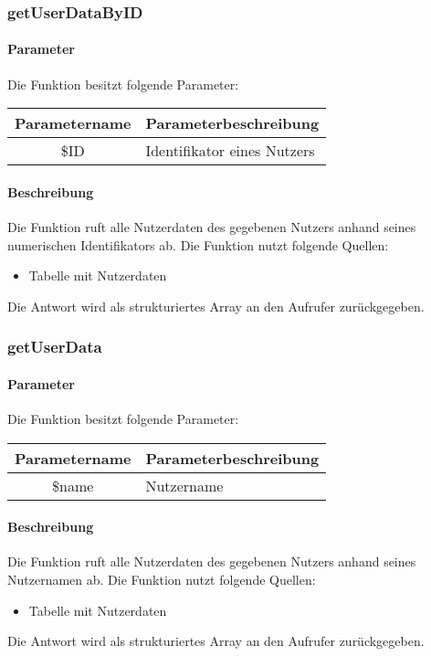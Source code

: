 \subsubsection{getUserDataByID}
\paragraph{Parameter} Die Funktion besitzt folgende Parameter:
\begin{table}[H]
	\begin{tabular}{|c|p{11cm}|}
		\hline
		\textbf{Parametername} & \textbf{Parameterbeschreibung} \\ \hline
		\$ID & Identifikator eines Nutzers \\ \hline
	\end{tabular}
\end{table}
\paragraph{Beschreibung} Die Funktion ruft alle Nutzerdaten des gegebenen Nutzers anhand seines numerischen Identifikators ab. Die Funktion nutzt folgende Quellen:
\begin{itemize}
	\item Tabelle mit Nutzerdaten
\end{itemize}
Die Antwort wird als strukturiertes Array an den Aufrufer zurückgegeben.
\subsubsection{getUserData}
\paragraph{Parameter} Die Funktion besitzt folgende Parameter:
\begin{table}[H]
	\begin{tabular}{|c|p{11cm}|}
		\hline
		\textbf{Parametername} & \textbf{Parameterbeschreibung} \\ \hline
		\$name & Nutzername \\ \hline
	\end{tabular}
\end{table}
\paragraph{Beschreibung} Die Funktion ruft alle Nutzerdaten des gegebenen Nutzers anhand seines Nutzernamen ab. Die Funktion nutzt folgende Quellen:
\begin{itemize}
	\item Tabelle mit Nutzerdaten
\end{itemize}
Die Antwort wird als strukturiertes Array an den Aufrufer zurückgegeben.
